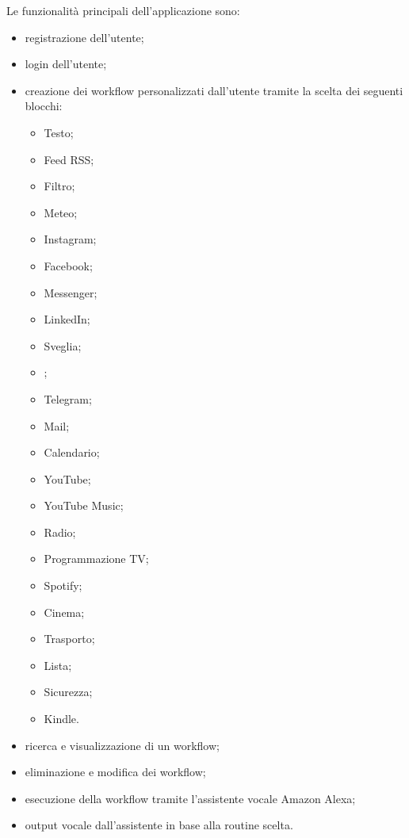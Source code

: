 {
    Le funzionalità principali dell'applicazione sono:
    \begin{itemize}
        \item registrazione dell'utente;
        \item login dell'utente;
        \item creazione dei workflow personalizzati dall'utente tramite la scelta dei seguenti blocchi:
        \begin{itemize}
            \item Testo;
            \item Feed RSS;
            \item Filtro;
            \item Meteo;
            \item Instagram;
            \item Facebook;
            \item Messenger;
            \item LinkedIn;
            \item Sveglia;
            \item {};
            \item Telegram;
            \item Mail;
            \item Calendario;
            \item YouTube;
            \item YouTube Music;
            \item Radio;
            \item Programmazione TV;
            \item Spotify;
            \item Cinema;
            \item Trasporto;
            \item Lista;
            \item Sicurezza;
            \item Kindle.
        \end{itemize}
        \item ricerca e visualizzazione di un workflow;
        \item eliminazione e modifica dei workflow;
        \item esecuzione della workflow tramite l'assistente vocale Amazon Alexa;
        \item output vocale dall'assistente in base alla routine scelta.
    \end{itemize}
}

